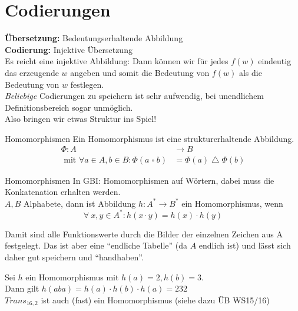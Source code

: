\section{Codierungen}

\begin{frame}
	\textbf{Übersetzung:} Bedeutungserhaltende Abbildung \\[0.5em] \pause
	\textbf{Codierung:} Injektive Übersetzung \\ \pause
	Es reicht eine injektive Abbildung: Dann können wir für jedes $f(w)$ eindeutig das erzeugende $w$ angeben und somit die Bedeutung von $f(w)$ als die Bedeutung von $w$ festlegen. \\[1em]
	
	\pause
	\emph{Beliebige }Codierungen zu speichern ist sehr aufwendig, bei unendlichem Definitionsbereich sogar unmöglich.\\
	Also bringen wir etwas Struktur ins Spiel!
\end{frame}

\begin{frame}{Homomorphismen}
	Ein Homomorphismus ist eine strukturerhaltende Abbildung. \\ \pause
	\begin{align*}
		\Phi : A &\to B \\
		\text{ mit } \forall a \in A, b \in B: \Phi(a \; \square \; b) &= \Phi(a) \; \triangle \; \Phi(b)
	\end{align*} 
\end{frame}

\begin{frame}{Homomorphismen}
	In GBI: Homomorphismen auf Wörtern, dabei muss die Konkatenation erhalten werden.\\
	$A, B$ Alphabete, dann ist Abbildung $h: A^* \to B^*$ ein Homomorphismus, wenn
	$$ \forall\ x, y\in A^* : h(x \cdot y) = h(x) \cdot h(y) $$
	
	\pause
	Damit sind alle Funktionswerte durch die Bilder der einzelnen Zeichen aus A festgelegt. Das ist aber eine \enquote{endliche Tabelle} (da $A$ endlich ist) und lässt sich daher gut speichern und \enquote{handhaben}.
	
	\pause
	\begin{Beispiel}
		Sei $h$ ein Homomorphismus mit $h(a) = 2, h(b) = 3$. \\
		Dann gilt $h(aba) = h(a) \cdot h(b) \cdot h(a) = 232 $ \\[0.5em]
		$Trans_{16,2}$ ist auch (fast) ein Homomorphismus (siehe dazu ÜB WS15/16)
	\end{Beispiel}
\end{frame}

